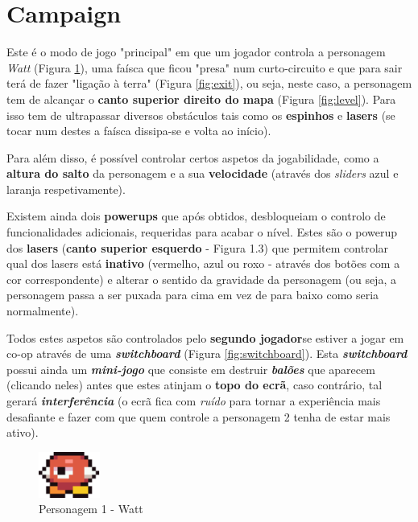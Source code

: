 \documentclass{report}
\begin{document}
\section{Campaign}

Este é o modo de jogo "principal" em que um jogador controla a personagem \textit{Watt} (Figura \ref{fig:watt}), uma faísca que ficou "presa" num curto-circuito e que para sair terá de fazer "ligação à terra" (Figura \ref{fig:exit}), ou seja, neste caso, a personagem tem de alcançar o \textbf{canto superior direito do mapa} (Figura \ref{fig:level}\footnotemark). Para isso tem de ultrapassar diversos obstáculos tais como os \textbf{espinhos} e \textbf{lasers} (se tocar num destes a faísca dissipa-se e volta ao início).

Para além disso, é possível controlar certos aspetos da jogabilidade, como a \textbf{altura do salto} da personagem e a sua \textbf{velocidade} (através dos \textit{sliders} azul e laranja respetivamente). 

Existem ainda dois \textbf{powerups} que após obtidos, desbloqueiam o controlo de funcionalidades adicionais, requeridas para acabar o nível. Estes são o powerup dos \textbf{lasers} (\textbf{canto superior esquerdo} - Figura 1.3) que permitem controlar qual dos lasers está \textbf{inativo} (vermelho, azul ou roxo - através dos botões com a cor correspondente) e alterar o sentido da gravidade da personagem (ou seja, a personagem passa a ser puxada para cima em vez de para baixo como seria normalmente). 

Todos estes aspetos são controlados pelo \textbf{segundo jogador}se estiver a jogar em co-op através de uma \textbf{\textit{switchboard}} (Figura \ref{fig:switchboard}). Esta \textbf{\textit{switchboard}} possui ainda um \textbf{\textit{mini-jogo}} que consiste em destruir \textbf{\textit{balões}} que aparecem (clicando neles) antes que estes atinjam o \textbf{topo do ecrã}, caso contrário, tal gerará \textbf{\textit{interferência}} (o ecrã fica com \textit{ruído} para tornar a experiência mais desafiante e fazer com que quem controle a personagem 2 tenha de estar mais ativo).

\begin{figure}[H]
	\centering
	\includegraphics{watt}
	\caption{Personagem 1 - Watt}
	\label{fig:watt}
\end{figure}
\end{document}
